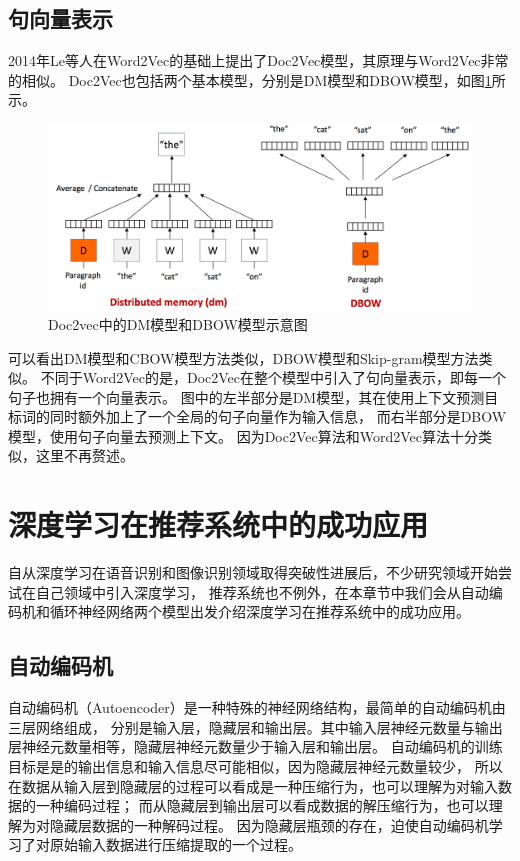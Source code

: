 \subsection{句向量表示}
2014年Le等人\parencite{le2014distributed}在Word2Vec的基础上提出了Doc2Vec模型，其原理与Word2Vec非常的相似。
Doc2Vec也包括两个基本模型，分别是DM模型和DBOW模型，如图\ref{fig:doc2vec}所示。

\begin{figure}[htbp]
\centering
\includegraphics[scale=0.4]{images/d2v.png}
\caption{Doc2vec中的DM模型和DBOW模型示意图}
\label{fig:doc2vec}
\end{figure}

可以看出DM模型和CBOW模型方法类似，DBOW模型和Skip-gram模型方法类似。
不同于Word2Vec的是，Doc2Vec在整个模型中引入了句向量表示，即每一个句子也拥有一个向量表示。
图中的左半部分是DM模型，其在使用上下文预测目标词的同时额外加上了一个全局的句子向量作为输入信息，
而右半部分是DBOW模型，使用句子向量去预测上下文。
因为Doc2Vec算法和Word2Vec算法十分类似，这里不再赘述。

\section{深度学习在推荐系统中的成功应用}
自从深度学习在语音识别和图像识别领域取得突破性进展后，不少研究领域开始尝试在自己领域中引入深度学习，
推荐系统也不例外，在本章节中我们会从自动编码机和循环神经网络两个模型出发介绍深度学习在推荐系统中的成功应用。

\subsection{自动编码机}
自动编码机（Autoencoder）是一种特殊的神经网络结构，最简单的自动编码机由三层网络组成，
分别是输入层，隐藏层和输出层。其中输入层神经元数量与输出层神经元数量相等，隐藏层神经元数量少于输入层和输出层。
自动编码机的训练目标是是的输出信息和输入信息尽可能相似，因为隐藏层神经元数量较少，
所以在数据从输入层到隐藏层的过程可以看成是一种压缩行为，也可以理解为对输入数据的一种编码过程；
而从隐藏层到输出层可以看成数据的解压缩行为，也可以理解为对隐藏层数据的一种解码过程。
因为隐藏层瓶颈的存在，迫使自动编码机学习了对原始输入数据进行压缩提取的一个过程。

